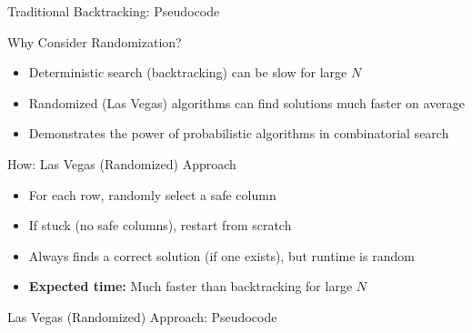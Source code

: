 \begin{frame}[fragile]{Traditional Backtracking: Pseudocode}
  \scriptsize
  \begin{algorithm}[H]
  \end{algorithm}
\end{frame}

\begin{frame}{Why Consider Randomization?}
  \begin{itemize}
    \item Deterministic search (backtracking) can be slow for large $N$ \parencite{motwani1995randomized}
    \item Randomized (Las Vegas) algorithms can find solutions much faster on average \parencite{lasvegas1979babai}
    \item Demonstrates the power of probabilistic algorithms in combinatorial search
  \end{itemize}
\end{frame}

\begin{frame}{How: Las Vegas (Randomized) Approach}
  \begin{itemize}
    \item For each row, randomly select a safe column
    \item If stuck (no safe columns), restart from scratch
    \item Always finds a correct solution (if one exists), but runtime is random
    \item \textbf{Expected time:} Much faster than backtracking for large $N$ \parencite{lasvegas1979babai}
  \end{itemize}
\end{frame}

\begin{frame}[fragile]{Las Vegas (Randomized) Approach: Pseudocode}
  \scriptsize
  \begin{algorithm}[H]
  \end{algorithm}
\end{frame}

